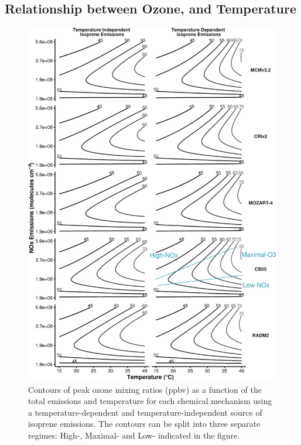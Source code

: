 \subsection[Relationship between ozone, NOx and Temperature]{Relationship between Ozone,  and Temperature} \label{ss:r_contours} 
\begin{figure}%
    \centering%
    \caption{Contours of peak ozone mixing ratios (ppbv) as a function of the total  emissions and temperature for each chemical mechanism using a temperature-dependent and temperature-independent source of isoprene emissions. The contours can be split into three separate regimes: High-, Maximal- and Low- indicated in the figure.}
    \label{f:ozone_contours}%
    \includegraphics[width=\textwidth]{img/O3_comparison}%
\end{figure}

